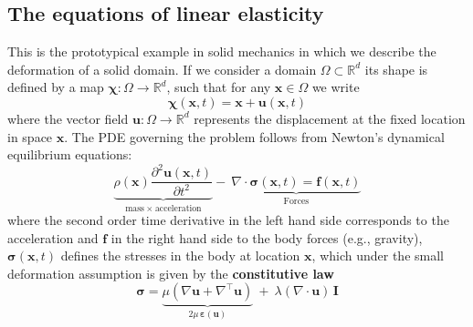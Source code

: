 \subsection{The equations of linear elasticity}

This is the prototypical example in solid mechanics in which we describe
the deformation of a solid domain. If we consider a
domain $\Omega \subset \mathbb{R}^d$ its shape is defined by
a map $\boldsymbol{\chi}: \Omega \rightarrow \mathbb{R}^d$, such that for any
$\mathbf{x} \in \Omega$ we write
\begin{equation}
\boldsymbol{\chi}(\mathbf{x},t) = \mathbf{x} + \mathbf{u}(\mathbf{x},t)
\end{equation}
where the vector field $\mathbf{u}: \Omega \rightarrow \mathbb{R}^{d}$
represents the displacement at the fixed location in space $\mathbf{x}$.
The PDE governing the problem follows from Newton's
dynamical equilibrium equations: 
\begin{equation}
\underbrace{\rho(\mathbf{x}) \dfrac{\partial^2\mathbf{u}(\mathbf{x},t)}{\partial{t}^2}}_{\mbox{mass}~\times~\mbox{acceleration}} -~ \underbrace{\nabla \cdot \boldsymbol{\sigma}(\mathbf{x},t) = \mathbf{f}(\mathbf{x},t)}_{\mbox{Forces}}
\end{equation}
where the second order time derivative in the left hand side corresponds
to the acceleration and $\mathbf{f}$ in the right hand side to the body forces (e.g., gravity),
$\boldsymbol{\sigma}(\mathbf{x},t)$ defines the stresses in the body at location $\mathbf{x}$,
which under the small deformation assumption is given by
the \textbf{constitutive law}
\begin{equation}
\boldsymbol{\sigma} =  \underbrace{\mu \left (\nabla{\mathbf{u}} + \nabla^{\intercal}{\mathbf{u}} \right)}_{2\mu\,\boldsymbol{\varepsilon}(\mathbf{u})} ~+~
\lambda (\nabla \cdot \mathbf{u}) \, \mathbf{I} 
\end{equation}
